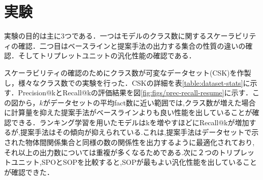 \section{実験}

実験の目的は主に3つである．一つはモデルのクラス数に関するスケーラビリティの確認．二つ目はベースラインと提案手法の出力する集合の性質の違いの確認．そしてトリプレットユニットの汎化性能の確認である．

スケーラビリティの確認のためにクラス数が可変なデータセット(CSK)を作製し，様々なクラス数での実験を行った．CSKの詳細を表\ref{table:dataset-stats}に示す．Precision@kとRecall@kの評価結果を図\ref{fig:figs/prec-recall-resume}に示す．この図から，$k$がデータセットの平均fact数に近い範囲では,クラス数が増えた場合に計算量を抑えた提案手法がベースラインよりも良い性能を出していることが確認できる．ランキング学習を用いたモデルはkを増やすほどにRecall@kが増加するが,提案手法はその傾向が抑えられている.これは,提案手法はデータセットで示された物体間関係集合と同様の数の関係性を出力するように最適化されており,それ以上の出力数については重複が多くなるためである.次に２つのトリプレットユニット,SPOとSOPを比較すると,SOPが最もよい汎化性能を出していることが確認できた．

